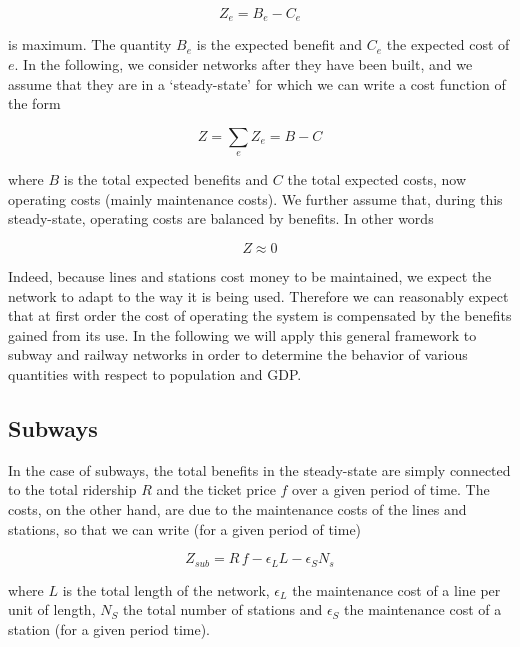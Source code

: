 \begin{equation} 
    Z_e = B_e - C_e 
\end{equation}

is maximum. The quantity $B_e$ is the expected benefit and $C_e$ the expected
cost of $e$. In the following, we consider networks after they have been built,
and we assume that they are in a `steady-state' for which we can write a cost
function of the form

\begin{equation} 
    Z =\sum_eZ_e= B - C 
\end{equation}

where $B$ is the total expected benefits and $C$ the total expected costs, now
operating costs (mainly maintenance costs). We further assume that, during this
steady-state, operating costs are balanced by benefits. In other words


\begin{equation} 
    Z \approx 0 
\end{equation} 

Indeed, because lines and stations cost money to be maintained, we expect the
network to adapt to the way it is being used. Therefore we can reasonably expect
that at first order the cost of operating the system is compensated by the
benefits gained from its use.  In the following we will apply this general
framework to subway and railway networks in order to determine the behavior of
various quantities with respect to population and GDP.

\subsection{Subways}

In the case of subways, the total benefits in the steady-state are simply
connected to the total ridership $R$ and the ticket price $f$ over a given
period of time. The costs, on the other hand, are due to the maintenance costs
of the lines and stations, so that we can write (for a given period of time)

\begin{equation}
    Z_{sub} = R\,f - \epsilon_L L - \epsilon_S N_s
    \label{eq:cost-benefit}
\end{equation}

where $L$ is the total length of the network, $\epsilon_L$ the maintenance cost
of a line per unit of length, $N_S$ the total number of stations and
$\epsilon_S$ the maintenance cost of a station (for a given period time).

